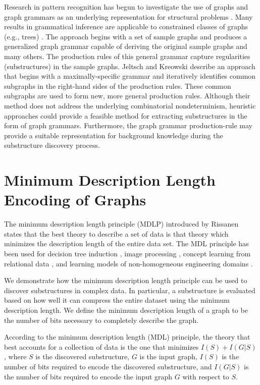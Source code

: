 Research in pattern recognition has begun to investigate the use of graphs
and graph grammars as an underlying representation for structural problems
\cite{schalkoff/book/92}.  Many results in grammatical inference are
applicable to constrained classes of graphs (e.g., trees)
\cite{fu/book/82,miclet/86}.  The approach begins with a set of sample
graphs and produces a generalized graph grammar capable of deriving the
original sample graphs and many others.  The production rules of this
general grammar capture regularities (substructures) in the sample graphs.
Jeltsch and Kreowski \cite{jeltsch/91} describe an approach that begins with a
maximally-specific grammar and iteratively identifies common subgraphs in
the right-hand sides of the production rules.  These common subgraphs are
used to form new, more general production rules.  Although their method
does not address the underlying combinatorial nondeterminism, heuristic
approaches could provide a feasible method for extracting substructures in
the form of graph grammars.  Furthermore, the graph grammar production-rule
may provide a suitable representation for background knowledge during the
substructure discovery process.

\section{Minimum Description Length Encoding of Graphs}
\label{s:mdl}

The minimum description length principle (MDLP) introduced by
Rissanen \cite{rmdl89} states that the best theory to describe a set of
data is that theory which minimizes the description length of the entire
data set.  The MDL principle has been used for decision tree induction
\cite{quinlan/mdl}, image processing
\cite{pednault89,pentland89,leclerc89}, concept learning from
relational data \cite{derthick/aaai91}, and learning models of
non-homogeneous engineering domains \cite{rao/aaai92}.

We demonstrate how the minimum description length principle can be used to
discover substructures in complex data.  In particular, a substructure is
evaluated based on how well it can compress the entire dataset using the
minimum description length.  We define the minimum description length of a
graph to be the number of bits necessary to completely describe the graph.

According to the minimum description length (MDL) principle, the theory
that best accounts for a collection of data is the one that minimizes 
$I(S) + I(G|S)$, where $S$ is the discovered substructure, $G$ is the input
graph, $I(S)$ is the number of bits required to encode the discovered
substructure, and $I(G|S)$ is the number of bits required to encode the
input graph $G$ with respect to $S$.

